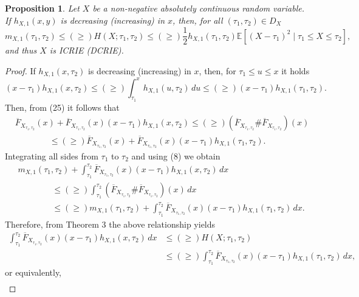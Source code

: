\documentclass[11pt]{article}
\newtheorem{proposition}{Proposition}
\begin{document}
 
\begin{proposition} 
	Let $X$ be a non-negative absolutely continuous random variable. If $h_{X,1}(x,y)$ is decreasing (increasing) in $x$, then, for all $(\tau_1,\tau_2)\in D_X$
	$$ \textstyle m_{X,1}(\tau_1,\tau_2) \leq (\geq) H(X;\tau_1,\tau_2) \leq (\geq) \frac{1}{2} h_{X,1}(\tau_1,\tau_2)\mathbb{E}[(X - \tau_1)^2 \mid \tau_1 \leq X \leq \tau_2], $$
	and thus $X$ is ICRIE (DCRIE).
\end{proposition}

\begin{proof}
	If $h_{X,1}(x,\tau_2)$ is decreasing (increasing) in $x$, then, for $\tau_1 \leq u \leq x$ it holds
	$$ \textstyle (x - \tau_1)h_{X,1}(x,\tau_2) \leq (\geq) \int_{\tau_1}^x h_{X,1}(u,\tau_2)\, du \leq (\geq) (x - \tau_1)h_{X,1}(\tau_1,\tau_2). $$
	Then, from (25) it follows that
	\begin{align*} 
		& \textstyle \overline{F}_{X_{\tau_1,\tau_2}}(x) + \overline{F}_{X_{\tau_1,\tau_2}}(x)(x - \tau_1)h_{X,1}(x,\tau_2) \leq (\geq) (\overline{F}_{X_{\tau_1,\tau_2}} \# \overline{F}_{X_{\tau_1,\tau_2}})(x) \\
		& \textstyle \qquad \qquad \leq (\geq) \overline{F}_{X_{\tau_1,\tau_2}}(x) + \overline{F}_{X_{\tau_1,\tau_2}}(x)(x - \tau_1)h_{X,1}(\tau_1,\tau_2).
	\end{align*}
	Integrating all sides from $\tau_1$ to $\tau_2$ and using (8) we obtain
	\begin{align*}
		& \textstyle m_{X,1}(\tau_1,\tau_2) + \int_{\tau_1}^{\tau_2} \overline{F}_{X_{\tau_1,\tau_2}}(x)(x - \tau_1)h_{X,1}(x,\tau_2)\, dx \\
		& \textstyle \qquad \qquad \leq (\geq) \textstyle  \int_{\tau_1}^{\tau_2} (\overline{F}_{X_{\tau_1,\tau_2}} \# \overline{F}_{X_{\tau_1,\tau_2}})(x)\, dx \\
		& \textstyle \qquad \qquad \leq (\geq) m_{X,1}(\tau_1,\tau_2) + \int_{\tau_1}^{\tau_2} \overline{F}_{X_{\tau_1,\tau_2}}(x)(x - \tau_1)h_{X,1}(\tau_1,\tau_2)\, dx.
	\end{align*}
	Therefore, from Theorem 3 the above relationship yields
	\begin{align*}
		\textstyle \int_{\tau_1}^{\tau_2} \overline{F}_{X_{\tau_1,\tau_2}}(x)(x - \tau_1)h_{X,1}(x,\tau_2)\, dx & \leq (\geq) H(X;\tau_1,\tau_2) \\
		& \textstyle \leq (\geq) \int_{\tau_1}^{\tau_2} \overline{F}_{X_{\tau_1,\tau_2}}(x)(x - \tau_1)h_{X,1}(\tau_1,\tau_2)\, dx, 
	\end{align*}
	or equivalently,
	\begin{align*} 

\end{align*}
\end{proof}
\end{document}
